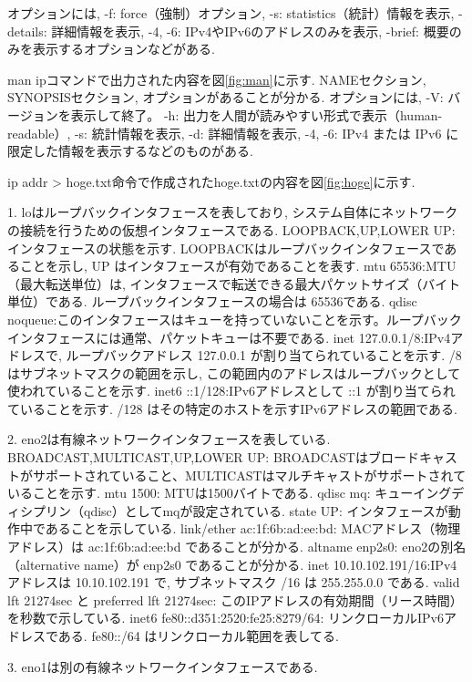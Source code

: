 \documentclass{ltjsarticle} %
\begin{document}
オプションには, 
-f: force（強制）オプション, 
-s: statistics（統計）情報を表示, 
-details: 詳細情報を表示, 
-4, -6: IPv4やIPv6のアドレスのみを表示,
-brief: 概要のみを表示するオプションなどがある. 

man ipコマンドで出力された内容を図\ref{fig:man}に示す. 
NAMEセクション, SYNOPSISセクション, オプションがあることが分かる.
オプションには, -V: バージョンを表示して終了。
-h: 出力を人間が読みやすい形式で表示（human-readable）, 
-s: 統計情報を表示, 
-d: 詳細情報を表示, 
-4, -6: IPv4 または IPv6 に限定した情報を表示するなどのものがある.

ip addr > hoge.txt命令で作成されたhoge.txtの内容を図\ref{fig:hoge}に示す. 

1. loはループバックインタフェースを表しており, システム自体にネットワークの接続を行うための仮想インタフェースである. 
LOOPBACK,UP,LOWER UP:インタフェースの状態を示す. LOOPBACKはループバックインタフェースであることを示し, UP はインタフェースが有効であることを表す.
mtu 65536:MTU（最大転送単位）は, インタフェースで転送できる最大パケットサイズ（バイト単位）である. ループバックインタフェースの場合は 65536である.
qdisc noqueue:このインタフェースはキューを持っていないことを示す。ループバックインタフェースには通常、パケットキューは不要である.
inet 127.0.0.1/8:IPv4アドレスで, ループバックアドレス 127.0.0.1 が割り当てられていることを示す. 
/8 はサブネットマスクの範囲を示し, この範囲内のアドレスはループバックとして使われていることを示す.
inet6 ::1/128:IPv6アドレスとして ::1 が割り当てられていることを示す. /128 はその特定のホストを示すIPv6アドレスの範囲である.

2. eno2は有線ネットワークインタフェースを表している.
BROADCAST,MULTICAST,UP,LOWER UP: BROADCASTはブロードキャストがサポートされていること、MULTICASTはマルチキャストがサポートされていることを示す.
mtu 1500: MTUは1500バイトである.
qdisc mq: キューイングディシプリン（qdisc）としてmqが設定されている.
state UP: インタフェースが動作中であることを示している.
link/ether ac:1f:6b:ad:ee:bd: MACアドレス（物理アドレス）は ac:1f:6b:ad:ee:bd であることが分かる.
altname enp2s0: eno2の別名（alternative name）が enp2s0 であることが分かる.
inet 10.10.102.191/16:IPv4アドレスは 10.10.102.191 で, サブネットマスク /16 は 255.255.0.0 である. 
valid lft 21274sec と preferred lft 21274sec: このIPアドレスの有効期間（リース時間）を秒数で示している.
inet6 fe80::d351:2520:fe25:8279/64: リンクローカルIPv6アドレスである. fe80::/64 はリンクローカル範囲を表してる.

3. eno1は別の有線ネットワークインタフェースである.
\end{document}
